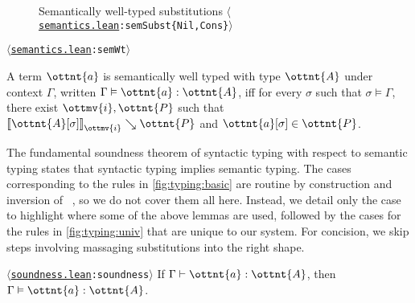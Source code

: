 \documentclass[a4paper,UKenglish,cleveref,autoref,thm-restate]{lipics-v2021}
\newcommand{\citep}[1]{\cite{#1}}
\newcommand{\repo}{https://github.com/ionathanch/TTBFL}
\newcommand{\thmref}[2]{%
  $\langle$\href{\repo/tree/main/src/#1}{\texttt{#1}}\texttt{:#2}$\rangle$%
}
\begin{document}
\begin{figure}
\caption{Semantically well-typed substitutions \thmref{semantics.lean}{semSubst\{Nil,Cons\}}}
\label{fig:sem:subst}
\end{figure}

\begin{definition} \thmref{semantics.lean}{semWt}
  A term $\ottnt{a}$ is semantically well typed with type $\ottnt{A}$ under context $\Gamma$,
  written $ \Gamma  \vDash  \ottnt{a}  :  \ottnt{A} $, iff for every $\sigma$ such that $ \sigma  \vDash  \Gamma $,
  there exist $\ottmv{i}, \ottnt{P}$ such that
  $ \mathopen{\llbracket}   \ottnt{A} [  \sigma  ]   \mathclose{\rrbracket}_{ \ottmv{i} } \searrow  \ottnt{P} $ and $  \ottnt{a} [  \sigma  ]   \in  \ottnt{P} $.
\end{definition}

The fundamental soundness theorem of syntactic typing with respect to semantic typing
states that syntactic typing implies semantic typing.
The cases corresponding to the rules in \cref{fig:typing:basic} are routine
by construction and inversion of ~\citep{lr-pearl},
so we do not cover them all here.
Instead, we detail only the  case to highlight
where some of the above lemmas are used,
followed by the cases for the rules in \cref{fig:typing:univ}
that are unique to our system.
For concision, we skip steps involving massaging substitutions into the right shape.

\begin{theorem}[Soundness] \thmref{soundness.lean}{soundness} \label{thm:soundness}
  If $ \Gamma  \vdash  \ottnt{a}  \mathrel{:}  \ottnt{A} $, then $ \Gamma  \vDash  \ottnt{a}  :  \ottnt{A} $.
\end{theorem}
\end{document}
